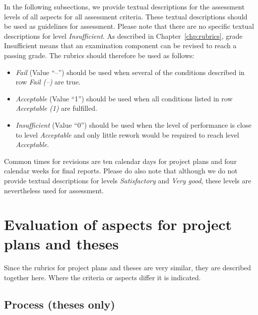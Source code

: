 \documentclass[a4paper,12pt]{book}
\begin{document}
In the following subsections, we provide textual descriptions for the assessment
levels of all aspects for all assessment criteria. These textual descriptions should
be used as guidelines for assessment. Please note that there
are no specific textual descriptions for level \emph{Insufficient}.
As described in Chapter~\ref{chp:rubrics}, grade Insufficient means that an examination component can be revised to reach a passing grade.
The rubrics should therefore be used as follows:
\label{ref:two-fails}
\begin{itemize}
    \item \emph{Fail} (Value ``--'') should be used when several of the conditions described in row \emph{Fail (--)} are true.
    \item \emph{Acceptable}  (Value ``1'') should be used when all conditions listed in row \emph{Acceptable (1)} are fulfilled.
    \item \emph{Insufficient} (Value ``0'') should be used when the level of performance is close to level \emph{Acceptable} and only little rework would be required to reach level \emph{Acceptable}.
\end{itemize}
Common times for revisions are ten calendar days for project plans and four calendar weeks for final reports.
Please do also note that although we do not provide textual descriptions for levels
\emph{Satisfactory} and \emph{Very good}, these levels are nevertheless used for
assessment.


\clearpage
\section{Evaluation of aspects for project plans and theses}
%
Since the rubrics for project plans and theses are very similar,
they are described together here. Where the criteria or aspects differ it is indicated. 

\newcommand\tableEntryInsufficient{\multicolumn{1}{|c|}{\footnotesize{\textit{Close to level \emph{Acceptable}; minor rework required to reach \emph{Acceptable}.}}}} %
%
\subsection{Process (theses only)}
\end{document}
